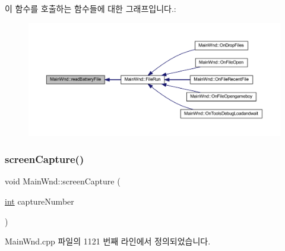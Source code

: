 이 함수를 호출하는 함수들에 대한 그래프입니다.\+:
\nopagebreak
\begin{figure}[H]
\begin{center}
\leavevmode
\includegraphics[width=350pt]{class_main_wnd_a6f37e1bbcd8c635131b84ded2786578b_icgraph}
\end{center}
\end{figure}
\mbox{\label{class_main_wnd_aea243ed57e88a9efec1196d510d6b235}} 
\subsubsection{\texorpdfstring{screen\+Capture()}{screenCapture()}}
{\footnotesize\ttfamily void Main\+Wnd\+::screen\+Capture (\begin{DoxyParamCaption}\item[{\mbox{\hyperlink{_util_8cpp_a0ef32aa8672df19503a49fab2d0c8071}{int}}}]{capture\+Number }\end{DoxyParamCaption})}



Main\+Wnd.\+cpp 파일의 1121 번째 라인에서 정의되었습니다.


